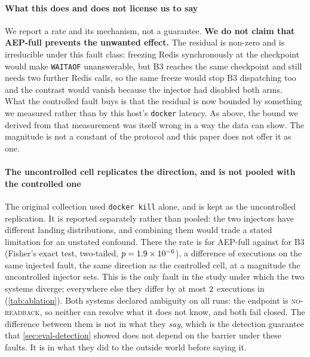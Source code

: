 \paragraph{What this does and does not license us to say} We report a rate and
its mechanism, not a guarantee. \textbf{We do not claim that AEP-full prevents
the unwanted effect.} The residual is non-zero and is irreducible under this
fault class: freezing Redis synchronously at the checkpoint would make
\texttt{WAITAOF} unanswerable, but B3 reaches the same checkpoint and still
needs two further Redis calls, so the same freeze would stop B3 dispatching too
and the contrast would vanish because the injector had disabled both arms. What
the controlled fault buys is that the residual is now bounded by something we
measured rather than by this host's \texttt{docker} latency. As above, the
bound we derived from that measurement was itself wrong in a way the data can
show. The magnitude is not a constant of the protocol and this paper does
not offer it as one.

\paragraph{The uncontrolled cell replicates the direction, and is not pooled
with the controlled one} The original collection used \texttt{docker kill}
alone, and is kept as the uncontrolled replication. It is reported separately
rather than pooled: the two injectors have different landing distributions, and
combining them would trade a stated limitation for an unstated confound. There
the rate is \AepUnwantedRate{} for AEP-full against \BthreeUnwantedRate{} for B3
(Fisher's exact test, two-tailed, $p = 1.9\times10^{-6}{}$), a difference of
\UnwantedPrevented{} executions on the same injected fault, the same
direction as the controlled cell, at a magnitude the uncontrolled injector sets.
This is the only fault in the study under which the two systems diverge;
everywhere else they differ by at most $2{}$ executions in
\BthreeVsAepN{} (\cref{tab:ablation}). Both systems declared ambiguity on all
\AepKillRuns{} runs: the endpoint is \textsc{no-readback}, so neither can
resolve what it does not know, and both fail closed. The difference between them
is not in what they \emph{say}, which is the detection guarantee that
\cref{sec:eval-detection} showed does not depend on the barrier under these
faults. It is
in what they did to the outside world before saying it.

